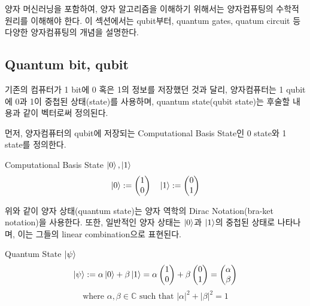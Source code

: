 양자 머신러닝을 포함하여, 양자 알고리즘을 이해하기 위해서는 양자컴퓨팅의 수학적 원리를 이해해야 한다. 이 섹션에서는 qubit부터, quantum gates, quatum circuit 등 다양한 양자컴퓨팅의 개념을 설명한다.

\subsection{Quantum bit, qubit}


기존의 컴퓨터가 1 bit에 0 혹은 1의 정보를 저장했던 것과 달리, 양자컴퓨터는 1 qubit에 0과 1이 중첩된 상태(state)를 사용하며, quantum state(qubit state)는 후술할 내용과 같이 벡터로써 정의된다.

\noindent 먼저, 양자컴퓨터의 qubit에 저장되는 Computational Basis State인 0 state와 1 state를 정의한다.

\begin{definition}
Computational Basis State \( \ket{0}, \ket{1} \)
\[
    \ket{0} := \begin{pmatrix} 1 \\ 0 \end{pmatrix} \quad
    \ket{1} := \begin{pmatrix} 0 \\ 1 \end{pmatrix}
\]
\end{definition}

\noindent 위와 같이 양자 상태(quantum state)는 양자 역학의 Dirac Notation(bra-ket notation)을 사용한다. 또한, 일반적인 양자 상태는 \(\ket{0}\)과 \(\ket{1}\)의 중첩된 상태로 나타나며, 이는 그들의 linear combination으로 표현된다.

\begin{definition}
 Quantum State \( \ket{\psi} \)
\[
    \ket{\psi} := \alpha \ket{0} + \beta \ket{1} = \alpha \begin{pmatrix} 1 \\ 0 \end{pmatrix} + \beta \begin{pmatrix} 0 \\ 1 \end{pmatrix} = \begin{pmatrix} \alpha \\ \beta \end{pmatrix}
\]
\[
    \text{where } \alpha, \beta \in \mathbb{C} \text{ such that } |\alpha|^2 + |\beta|^2 = 1
\]
\end{definition}


